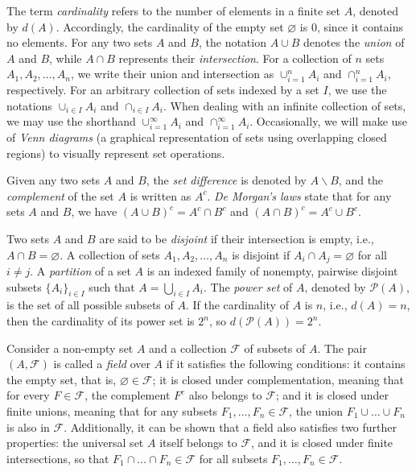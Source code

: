 The term \emph{cardinality} refers to the number of elements in a finite set $A$, denoted by $d(A)$. Accordingly, the cardinality of the empty set $\varnothing$ is 0, since it contains no elements. For any two sets $A$ and $B$, the notation $A \cup B$ denotes the \emph{union} of $A$ and $B$, while $A \cap B$ represents their \emph{intersection}. For a collection of $n$ sets $A_1, A_2, \ldots, A_n$, we write their union and intersection as $\cup_{i=1}^n A_i$ and $\cap_{i=1}^n A_i$, respectively. For an arbitrary collection of sets indexed by a set $I$, we use the notations $\cup_{i \in I} A_i$ and $\cap_{i \in I} A_i$. When dealing with an infinite collection of sets, we may use the shorthand $\cup_{i=1}^{\infty} A_i$ and $\cap_{i=1}^{\infty} A_i$. Occasionally, we will make use of \emph{Venn diagrams} (a graphical representation of sets using overlapping closed regions) to visually represent set operations.

Given any two sets $A$ and $B$, the \emph{set difference} is denoted by $A \backslash B$, and the \emph{complement} of the set $A$ is written as $A^c$. \emph{De Morgan's laws} state that for any sets $A$ and $B$, we have $\left( A \cup B \right)^c = A^c \cap B^c$ and $\left( A \cap B \right)^c = A^c \cup B^c$.

Two sets $A$ and $B$ are said to be \emph{disjoint} if their intersection is empty, i.e., $A \cap B = \varnothing$. A collection of sets $A_1, A_2, \ldots, A_n$ is disjoint if $A_i \cap A_j = \varnothing$ for all $i \neq j$. A \emph{partition} of a set $A$ is an indexed family of nonempty, pairwise disjoint subsets $\{A_i\}_{i \in I}$ such that $A = \bigcup_{i \in I} A_i$. The \emph{power set} of $A$, denoted by $\mathcal{P}(A)$, is the set of all possible subsets of $A$. If the cardinality of $A$ is $n$, i.e., $d(A) = n$, then the cardinality of its power set is $2^n$, so $d\left( \mathcal{P}(A) \right) = 2^n$.

Consider a non-empty set $A$ and a collection $\mathcal{F}$ of subsets of $A$. The pair $\left( A, \mathcal{F} \right)$ is called a \emph{field} over $A$ if it satisfies the following conditions: it contains the empty set, that is, $\varnothing \in \mathcal{F}$; it is closed under complementation, meaning that for every $F \in \mathcal{F}$, the complement $F^c$ also belongs to $\mathcal{F}$; and it is closed under finite unions, meaning that for any subsets $F_1, \ldots, F_n \in \mathcal{F}$, the union $F_1 \cup \ldots \cup F_n$ is also in $\mathcal{F}$. Additionally, it can be shown that a field also satisfies two further properties: the universal set $A$ itself belongs to $\mathcal{F}$, and it is closed under finite intersections, so that $F_1 \cap \ldots \cap F_n \in \mathcal{F}$ for all subsets $F_1, \ldots, F_n \in \mathcal{F}$.

